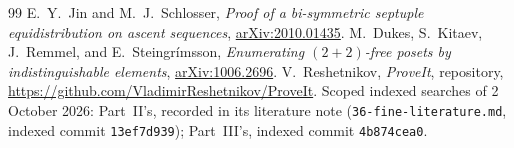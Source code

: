 \documentclass[11pt,letterpaper]{article}
\newcommand{\file}[1]{\nolinkurl{#1}}
\theoremstyle{remark}
\begin{document}
\begin{thebibliography}{99}
E.~Y.~Jin and M.~J.~Schlosser, \emph{Proof of a bi-symmetric septuple equidistribution on ascent sequences}, \href{https://arxiv.org/abs/2010.01435}{arXiv:2010.01435}.
M.~Dukes, S.~Kitaev, J.~Remmel, and E.~Steingr\'{i}msson,
\emph{Enumerating $(2+2)$-free posets by indistinguishable elements}, \href{https://arxiv.org/abs/1006.2696}{arXiv:1006.2696}.
V.~Reshetnikov, \emph{ProveIt}, repository, \url{https://github.com/VladimirReshetnikov/ProveIt}. Scoped indexed searches of 2 October 2026: Part~II's, recorded in its literature note (\file{36-fine-literature.md}, indexed commit \texttt{13ef7d939}); Part~III's, indexed commit \texttt{4b874cea0}.
\end{thebibliography}
\end{document}
